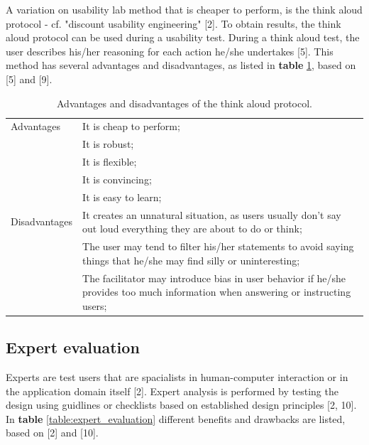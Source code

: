 A variation on usability lab method that is cheaper to perform, is the think aloud protocol - cf. "discount usability engineering" [2]. To obtain results, the think aloud protocol can be used during a usability test. During a think aloud test, the user describes his/her reasoning for each action he/she undertakes [5]. This method has several advantages and disadvantages, as listed in \textbf{table} \ref{table:usability_engineering}, based on [5] and [9].

\begin{table}[H]
	\begin{center}
		\begin{tabular}{l p{300px}}
			\hline
			Advantages		&		It is cheap to perform; \\
										&		It is robust; \\
										&		It is flexible; \\ %
										&		It is convincing; \\
										&		It is easy to learn; \\
			\hline
			Disadvantages	&		It creates an unnatural situation, as users usually don't say out loud everything they are about to do or think; \\
										&		The user may tend to filter his/her statements to avoid saying things that he/she may find silly or uninteresting; \\
										&		The facilitator may introduce bias in user behavior if he/she provides too much information when answering or instructing users; \\
			\hline
		\end{tabular}
	\end{center}
	\caption{Advantages and disadvantages of the think aloud protocol.}
	\label{table:usability_engineering}
\end{table}





\subsection{Expert evaluation}

Experts are test users that are spacialists in human-computer interaction or in the application domain itself [2]. Expert analysis is performed by testing the design using guidlines or checklists based on established design principles [2, 10]. In \textbf{table} \ref{table:expert_evaluation} different benefits and drawbacks are listed, based on [2] and [10].

